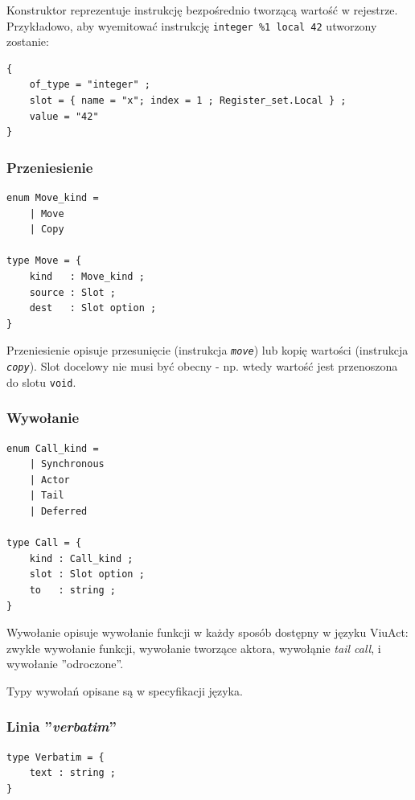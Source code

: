 \documentclass[11pt,oneside,a4paper,titlepage,onecolumn]{article}
\begin{document}
Konstruktor reprezentuje instrukcję bezpośrednio tworzącą wartość w rejestrze. Przykładowo, aby wyemitować
instrukcję \texttt{integer \%1 local 42} utworzony zostanie:

\begin{lstlisting}
{
    of_type = "integer" ;
    slot = { name = "x"; index = 1 ; Register_set.Local } ;
    value = "42"
}
\end{lstlisting}

\subsubsection{Przeniesienie}
\label{diagram_klas_przeniesienie}

\begin{lstlisting}
enum Move_kind =
    | Move
    | Copy

type Move = {
    kind   : Move_kind ;
    source : Slot ;
    dest   : Slot option ;
}
\end{lstlisting}

Przeniesienie opisuje przesunięcie (instrukcja \emph{\texttt{move}}) lub kopię wartości (instrukcja
\emph{\texttt{copy}}). Slot docelowy nie musi być obecny - np. wtedy wartość jest przenoszona do slotu
\texttt{void}.

\subsubsection{Wywołanie}
\label{diagram_klas_wywolanie}

\begin{lstlisting}
enum Call_kind =
    | Synchronous
    | Actor
    | Tail
    | Deferred

type Call = {
    kind : Call_kind ;
    slot : Slot option ;
    to   : string ;
}
\end{lstlisting}

Wywołanie opisuje wywołanie funkcji w każdy sposób dostępny w języku ViuAct: zwykłe wywołanie funkcji,
wywołanie tworzące aktora, wywołąnie \emph{tail call}, i wywołanie ''odroczone''.

Typy wywołań opisane są w specyfikacji języka.

\subsubsection{Linia ''\emph{verbatim}''}
\label{diagram_klas_linia_verbatim}

\begin{lstlisting}
type Verbatim = {
    text : string ;
}
\end{lstlisting}
\end{document}
